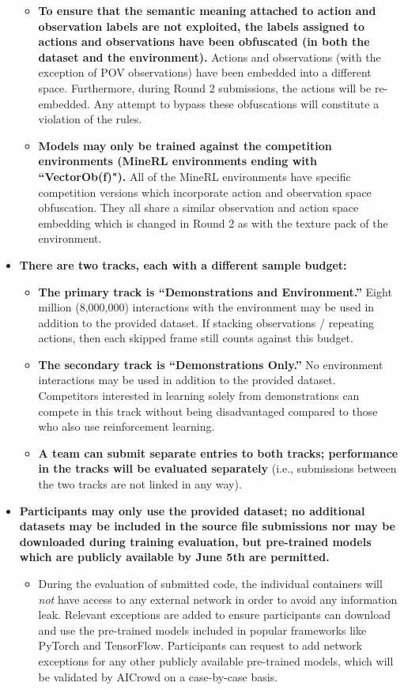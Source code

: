 \begin{itemize}
\begin{itemize}
        \item \textbf{To ensure that the semantic meaning attached to action and observation labels are not exploited, the labels assigned to actions and observations have been obfuscated (in both the dataset and the environment).} Actions and observations (with the exception of POV observations) have been embedded into a different space. Furthermore, during Round 2 submissions, the actions will be re-embedded. Any attempt to bypass these obfuscations will constitute a violation of the rules.
        \item \textbf{Models may only be trained against the competition environments (MineRL environments ending with “VectorOb(f)").}  All of the MineRL environments have specific competition versions which incorporate action and observation space obfuscation. They all share a similar observation and action space embedding which is changed in Round 2 as with the texture pack of the environment. 
    \end{itemize}
    \item \textbf{There are two tracks, each with a different sample budget:}
    \begin{itemize}
        \item \textbf{The primary track is ``Demonstrations and Environment.''} Eight million (8,000,000) interactions with the environment may be used in addition to the provided dataset. If stacking observations / repeating actions, then each skipped frame still counts against this budget.
        \item \textbf{The secondary track is ``Demonstrations Only.''} No environment interactions may be used in addition to the provided dataset. Competitors interested in learning solely from demonstrations can compete in this track without being disadvantaged compared to those who also use reinforcement learning. 
        \item \textbf{A team can submit separate entries to both tracks; performance in the tracks will be evaluated separately} (i.e., submissions between the two tracks are not linked in any way).
    \end{itemize}
    \item \textbf{Participants may only use the provided dataset; no additional datasets may be included in the source file submissions nor may be downloaded during training evaluation, but pre-trained models which are publicly available by June 5th are permitted.}
    \begin{itemize}
        \item During the evaluation of submitted code, the individual containers will \textit{not} have access to any external network in order to avoid any information leak. Relevant exceptions are added to ensure participants can download and use the pre-trained models included in popular frameworks like PyTorch and TensorFlow. Participants can request to add network exceptions for any other publicly available pre-trained models, which will be validated by AICrowd on a case-by-case basis.

\end{itemize}
\end{itemize}
